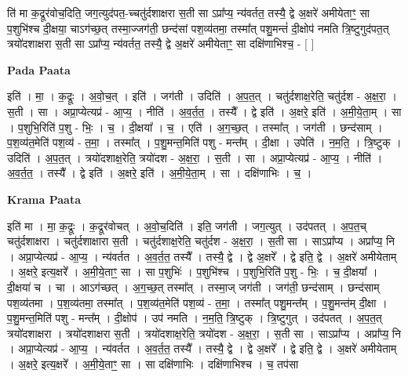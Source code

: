 \documentclass[17pt]{extarticle}
\begin{document}
ति॑ मा क॒द्रूर॑वोच॒दिति॒ जग॒त्युद॑पत॒-च्चतु॑र्दशाक्षरा स॒ती सा ऽप्रा᳚प्य॒ न्य॑वर्तत॒ तस्यै॒ द्वे अ॒क्षरे॑ अमीयेताꣳ॒॒ सा प॒शुभि॑श्च दी॒क्षया॒ चाऽग॑च्छ॒त् तस्मा॒ज्जग॑ती॒ छन्द॑सां पश॒व्य॑तमा॒ तस्मा᳚त् पशु॒मन्तं॑ दी॒क्षोप॑ नमति त्रि॒ष्टुगुद॑पत॒त् त्रयो॑दशाक्षरा स॒ती सा ऽप्रा᳚प्य॒ न्य॑वर्तत॒ तस्यै॒ द्वे अ॒क्षरे॑ अमीयेताꣳ॒॒ सा दक्षि॑णाभिश्च॒ - [  ] \newline

\textbf{Pada Paata} \newline

इति॑ । मा॒ । क॒द्रूः । अ॒वो॒च॒त् । इति॑ । जग॑ती । उदिति॑ । अ॒प॒त॒त् । चतु॑र्दशाक्ष॒रेति॒ चतु॑र्दश -   अ॒क्ष॒रा॒ । स॒ती । सा । अप्रा॒प्येत्यप्र॑ - आ॒प्य॒ । नीति॑ । अ॒व॒र्त॒त॒ । तस्यै᳚ । द्वे इति॑ । अ॒क्षरे॒ इति॑ । अ॒मी॒ये॒ता॒म् । सा । प॒शुभि॒रिति॑ प॒शु - भिः॒ । च॒ । दी॒क्षया᳚ । च॒ । एति॑ । अ॒ग॒च्छ॒त् । तस्मा᳚त् । जग॑ती । छन्द॑साम् । प॒श॒व्य॑त॒मेति॑ पश॒व्य॑ - त॒मा॒ । तस्मा᳚त् । प॒शु॒मन्त॒मिति॑ पशु - मन्त᳚म् । दी॒क्षा । उपेति॑ । न॒म॒ति॒ । त्रि॒ष्टुक् । उदिति॑ । अ॒प॒त॒त् । त्रयो॑दशाक्ष॒रेति॒ त्रयो॑दश - अ॒क्ष॒रा॒ । स॒ती । सा । अप्रा॒प्येत्यप्र॑ - आ॒प्य॒ । नीति॑ । अ॒व॒र्त॒त॒ । तस्यै᳚ । द्वे इति॑ । अ॒क्षरे॒ इति॑ । अ॒मी॒ये॒ता॒म् । सा । दक्षि॑णाभिः । च॒ ।  \newline


\textbf{Krama Paata} \newline

इति॑ मा । मा॒ क॒द्रूः । क॒द्रूर॑वोचत् । अ॒वो॒च॒दिति॑ । इति॒ जग॑ती । जग॒त्युत् । उद॑पतत् । अ॒प॒त॒च् चतु॑र्दशाक्षरा । चतु॑र्दशाक्षारा स॒ती । चतु॑र्दशाक्ष॒रेति॒ चतु॑र्दश - अ॒क्ष॒रा॒ । स॒ती सा । साऽप्रा᳚प्य । अप्रा᳚प्य॒ नि । अप्रा॒प्येत्यप्र॑ - आ॒प्य॒ । न्य॑वर्तत । अ॒व॒र्त॒त॒ तस्यै᳚ । तस्यै॒ द्वे । द्वे अ॒क्षरे᳚ । द्वे इति॒ द्वे । अ॒क्षरे॑ अमीयेताम् । अ॒क्षरे॒ इत्य॒क्षरे᳚ । अ॒मी॒ये॒ताꣳ॒॒ सा । सा प॒शुभिः॑ । प॒शुभि॑श्च । प॒शुभि॒रिति॑ प॒शु - भिः॒ । 
च॒ दी॒क्षया᳚ । दी॒क्षया॑ च । चा । आऽग॑च्छत् । अ॒ग॒च्छ॒त् तस्मा᳚त् । तस्मा॒ज् जग॑ती । जग॑ती॒ छन्द॑साम् । छन्द॑साम् पश॒व्य॑तमा । प॒श॒व्य॑तमा॒ तस्मा᳚त् । प॒श॒व्य॑त॒मेति॑ पश॒व्य॑ - त॒मा॒ । तस्मा᳚त् पशु॒मन्त᳚म् । प॒शु॒मन्त॑म् दी॒क्षा । प॒शु॒मन्त॒मिति॑ पशु - मन्त᳚म् । दी॒क्षोप॑ । उप॑ नमति । न॒म॒ति॒ त्रि॒ष्टुक् । त्रि॒ष्टुगुत् । उद॑पतत् । अ॒प॒त॒त् त्रयो॑दशाक्षरा । त्रयो॑दशाक्षरा स॒ती । त्रयो॑दशाक्ष॒रेति॒ त्रयो॑दश - अ॒क्ष॒रा॒ । स॒ती सा । साऽप्रा᳚प्य । अप्रा᳚प्य॒ नि । अप्रा॒प्येत्यप्र॑ - आ॒प्य॒ । न्य॑वर्तत । अ॒व॒र्त॒त॒ तस्यै᳚ । तस्यै॒ द्वे । द्वे अ॒क्षरे᳚ । द्वे इति॒ द्वे । अ॒क्षरे॑ अमीयेताम् । अ॒क्षरे॒ इत्य॒क्षरे᳚ । अ॒मी॒ये॒ताꣳ॒॒ सा । सा दक्षि॑णाभिः । दक्षि॑णाभिश्च । च॒ तप॑सा \newline
\end{document}
